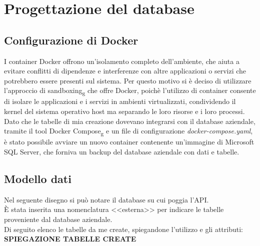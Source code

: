 \section{Progettazione del database}
\subsection{Configurazione di Docker}
I container Docker offrono un'isolamento completo dell'ambiente, che aiuta a evitare conflitti di dipendenze e interferenze con altre applicazioni o servizi che potrebbero essere presenti sul sistema. Per questo motivo si è deciso di utilizzare l'approccio di sandboxing\textsubscript{g} che offre Docker, poichè l'utilizzo di container consente di isolare le applicazioni e i servizi in ambienti virtualizzati, condividendo il kernel del sistema operativo host ma separando le loro risorse e i loro processi.\\
Dato che le tabelle di mia creazione dovevano integrarsi con il database aziendale, tramite il tool Docker Compose\textsubscript{g} e un file di configurazione \textit{docker-compose.yaml}, è stato possibile avviare un nuovo container contenente un'immagine di Microsoft SQL Server, che forniva un backup del database aziendale con dati e tabelle.\\

\subsection{Modello dati}
\noindent Nel seguente disegno si può notare il database su cui poggia l'API.\\
È stata inserita una nomenclatura <<esterna>> per indicare le tabelle proveniente dal database aziendale.\\
Di seguito elenco le tabelle da me create, spiegandone l'utilizzo e gli attributi:\\

\noindent \textbf{SPIEGAZIONE TABELLE CREATE}\\

